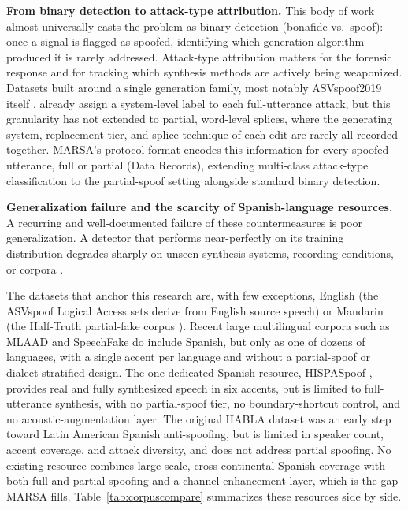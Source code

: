 \documentclass[11pt]{article}
\begin{document}
\textbf{From binary detection to attack-type attribution.} This body of work almost universally casts the problem as binary detection (bonafide vs.\ spoof): once a signal is flagged as spoofed, identifying which generation algorithm produced it is rarely addressed. Attack-type attribution matters for the forensic response and for tracking which synthesis methods are actively being weaponized. Datasets built around a single generation family, most notably ASVspoof2019 itself \citep{asvspoof2019}, already assign a system-level label to each full-utterance attack, but this granularity has not extended to partial, word-level splices, where the generating system, replacement tier, and splice technique of each edit are rarely all recorded together. MARSA's protocol format encodes this information for every spoofed utterance, full or partial (Data Records), extending multi-class attack-type classification to the partial-spoof setting alongside standard binary detection.

\textbf{Generalization failure and the scarcity of Spanish-language resources.} A recurring and well-documented failure of these countermeasures is poor generalization. A detector that performs near-perfectly on its training distribution degrades sharply on unseen synthesis systems, recording conditions, or corpora \citep{muller2022generalize,muller2024harder}.

The datasets that anchor this research are, with few exceptions, English (the ASVspoof Logical Access sets derive from English source speech) or Mandarin (the Half-Truth partial-fake corpus \citep{yi2021had}). Recent large multilingual corpora such as MLAAD \citep{mlaad} and SpeechFake \citep{speechfake} do include Spanish, but only as one of dozens of languages, with a single accent per language and without a partial-spoof or dialect-stratified design. The one dedicated Spanish resource, HISPASpoof \citep{hispaspoof}, provides real and fully synthesized speech in six accents, but is limited to full-utterance synthesis, with no partial-spoof tier, no boundary-shortcut control, and no acoustic-augmentation layer. The original HABLA dataset \citep{habla} was an early step toward Latin American Spanish anti-spoofing, but is limited in speaker count, accent coverage, and attack diversity, and does not address partial spoofing. No existing resource combines large-scale, cross-continental Spanish coverage with both full and partial spoofing and a channel-enhancement layer, which is the gap MARSA fills. Table~\ref{tab:corpuscompare} summarizes these resources side by side.
\end{document}

